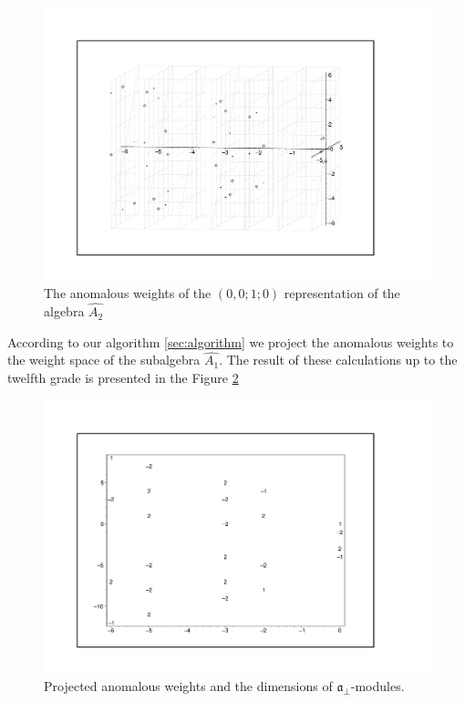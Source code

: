 \documentclass[a4paper,12pt]{article}
\theoremstyle{definition} \newtheorem{Def}{Definition}
\begin{document}
\begin{figure}[h!tb]
  \includegraphics[width=180mm]{AffineA2_A1_anom.pdf}
  \caption{The anomalous weights of the $(0,0;1;0)$ representation of the algebra $\hat{A_2}$}
  \label{fig:affine_A2_anom_point}
\end{figure}

According to our algorithm \ref{sec:algorithm} we project the anomalous weights to the weight space of the subalgebra $\hat{A_1}$.
The result of these calculations up to the twelfth grade is presented in the Figure \ref{fig:AffineA2_A1_anom_proj}
\begin{figure}[h!tb]
  \centering
  \includegraphics[width=150mm]{AffineA2_A1_proj_anom.pdf}
  \caption{Projected anomalous weights and the dimensions of $\mathfrak{a}_{\bot}$-modules.}
  \label{fig:AffineA2_A1_anom_proj}
\end{figure}
\end{document}
